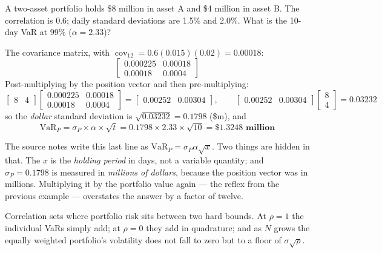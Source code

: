 \begin{imexbox}[title={A two-asset 10-day VaR}]
A two-asset portfolio holds \$8 million in asset A and \$4 million in asset B. The
correlation is 0.6; daily standard deviations are 1.5\% and 2.0\%. What is the
10-day VaR at 99\% ($\alpha = 2.33$)?

\medskip
The covariance matrix, with $\operatorname{cov}_{12} = 0.6(0.015)(0.02) = 0.00018$:
\[
\begin{bmatrix}0.000225 & 0.00018\\ 0.00018 & 0.0004\end{bmatrix}
\]
Post-multiplying by the position vector and then pre-multiplying:
\[
\begin{bmatrix}8 & 4\end{bmatrix}
\begin{bmatrix}0.000225 & 0.00018\\ 0.00018 & 0.0004\end{bmatrix}
= \begin{bmatrix}0.00252 & 0.00304\end{bmatrix},
\qquad
\begin{bmatrix}0.00252 & 0.00304\end{bmatrix}\begin{bmatrix}8\\4\end{bmatrix} = 0.03232
\]
so the \emph{dollar} standard deviation is $\sqrt{0.03232} = 0.1798$ (\$m), and
\[ \text{VaR}_P = \sigma_P \times \alpha \times \sqrt{t}
   = 0.1798 \times 2.33 \times \sqrt{10} = \mathbf{\$1.3248\text{ million}} \]
\end{imexbox}

\begin{imtrapbox}[breakable=false,title={A dollar sigma, not a percentage sigma}]
The source notes write this last line as $\text{VaR}_P = \sigma_P\alpha\sqrt{x}$.
Two things are hidden in that. The $x$ is the \emph{holding period} in days, not a
variable quantity; and $\sigma_P = 0.1798$ is measured in \emph{millions of
dollars}, because the position vector was in millions. Multiplying it by the
portfolio value again --- the reflex from the previous example --- overstates the
answer by a factor of twelve.
\end{imtrapbox}


Correlation sets where portfolio risk sits between two hard bounds. At $\rho=1$
the individual VaRs simply add; at $\rho=0$ they add in quadrature; and as $N$
grows the equally weighted portfolio's volatility does not fall to zero but to a
floor of $\sigma\sqrt{\rho}$.

